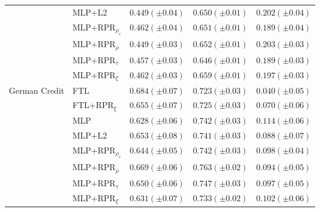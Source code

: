 \begin{tabular}{lllll}
 & MLP+L2 & $0.449 (\pm0.04)$ & $0.650 (\pm0.01)$ & $0.202 (\pm0.04)$ \\
 & MLP+RPR$_{\rho_s}$ & $0.462 (\pm0.04)$ & $0.651 (\pm0.01)$ & $0.189 (\pm0.04)$ \\
 & MLP+RPR$_{\rho}$ & $0.449 (\pm0.03)$ & $0.652 (\pm0.01)$ & $0.203 (\pm0.03)$ \\
 & MLP+RPR$_{\tau}$ & $0.457 (\pm0.03)$ & $0.646 (\pm0.01)$ & $0.189 (\pm0.03)$ \\
 & MLP+RPR$_{\xi}$ & $0.462 (\pm0.03)$ & $0.659 (\pm0.01)$ & $0.197 (\pm0.03)$ \\
\cline{1-5}
\multirow[t]{8}{*}{German Credit} & FTL & $0.684 (\pm0.07)$ & $0.723 (\pm0.03)$ & $0.040 (\pm0.05)$ \\
 & FTL+RPR$_{\xi}$ & $0.655 (\pm0.07)$ & $0.725 (\pm0.03)$ & $0.070 (\pm0.06)$ \\
 & MLP & $0.628 (\pm0.06)$ & $0.742 (\pm0.03)$ & $0.114 (\pm0.06)$ \\
 & MLP+L2 & $0.653 (\pm0.08)$ & $0.741 (\pm0.03)$ & $0.088 (\pm0.07)$ \\
 & MLP+RPR$_{\rho_s}$ & $0.644 (\pm0.05)$ & $0.742 (\pm0.03)$ & $0.098 (\pm0.04)$ \\
 & MLP+RPR$_{\rho}$ & $0.669 (\pm0.06)$ & $0.763 (\pm0.02)$ & $0.094 (\pm0.05)$ \\
 & MLP+RPR$_{\tau}$ & $0.650 (\pm0.06)$ & $0.747 (\pm0.03)$ & $0.097 (\pm0.05)$ \\
 & MLP+RPR$_{\xi}$ & $0.631 (\pm0.07)$ & $0.733 (\pm0.02)$ & $0.102 (\pm0.06)$ \\
\cline{1-5}
\bottomrule
\end{tabular}

